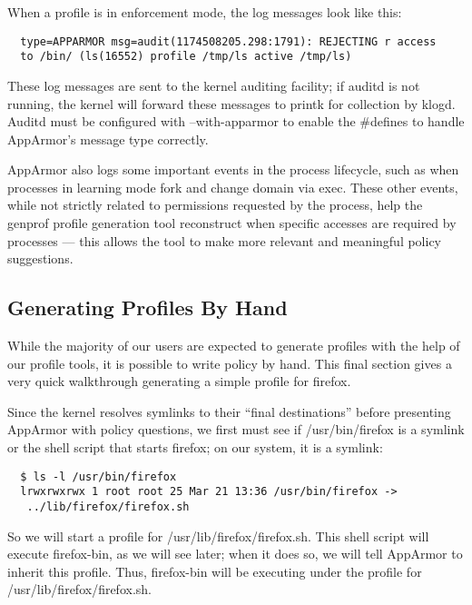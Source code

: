 \documentclass[a4paper]{article}
\renewcommand{\H}{\hspace{0pt}}
\begin{document}
When a profile is in enforcement mode, the log messages look like this:

\begin{small}
\begin{verbatim}
  type=APPARMOR msg=audit(1174508205.298:1791): REJECTING r access
  to /bin/ (ls(16552) profile /tmp/ls active /tmp/ls)
\end{verbatim}
\end{small}

These log messages are sent to the kernel auditing facility; if auditd
is not running, the kernel will forward these messages to printk for
collection by klogd. Auditd must be configured with --with-apparmor to
enable the \#defines to handle AppArmor's message type correctly.

AppArmor also logs some important events in the process lifecycle,
such as when processes in learning mode fork and change domain via
exec. These other events, while not strictly related to permissions
requested by the process, help the genprof profile generation tool
reconstruct when specific accesses are required by processes --- this
allows the tool to make more relevant and meaningful policy suggestions.

\subsection{Generating Profiles By Hand}

While the majority of our users are expected to generate profiles with
the help of our profile tools, it is possible to write policy by hand.
This final section gives a very quick walkthrough generating a simple
profile for firefox.

Since the kernel resolves symlinks to their ``final destinations'' before
presenting AppArmor with policy questions, we first must see if
/usr/{\H}bin/{\H}firefox is a symlink or the shell script that starts firefox;
on our system, it is a symlink:

\begin{small}
\begin{verbatim}
  $ ls -l /usr/bin/firefox
  lrwxrwxrwx 1 root root 25 Mar 21 13:36 /usr/bin/firefox ->
   ../lib/firefox/firefox.sh
\end{verbatim}
\end{small}

So we will start a profile for /usr/{\H}lib/{\H}firefox/{\H}firefox.sh. This shell
script will execute firefox-bin, as we will see later; when it does so,
we will tell AppArmor to inherit this profile. Thus, firefox-bin will
be executing under the profile for /usr/{\H}lib/{\H}firefox/{\H}firefox.sh.
\end{document}
